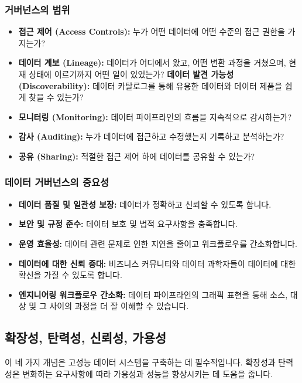 \documentclass[11pt,a4paper]{article}
\theoremstyle{definition}
\begin{document}
\begin{enumerate}
\subsubsection{거버넌스의 범위}
\begin{itemize}
    \item \textbf{접근 제어 (Access Controls):} 누가 어떤 데이터에 어떤 수준의 접근 권한을 가지는가?
    \item \textbf{데이터 계보 (Lineage):} 데이터가 어디에서 왔고, 어떤 변환 과정을 거쳤으며, 현재 상태에 이르기까지 어떤 일이 있었는가?
    \textbf{데이터 발견 가능성 (Discoverability):} 데이터 카탈로그를 통해 유용한 데이터와 데이터 제품을 쉽게 찾을 수 있는가?
    \item \textbf{모니터링 (Monitoring):} 데이터 파이프라인의 흐름을 지속적으로 감시하는가?
    \item \textbf{감사 (Auditing):} 누가 데이터에 접근하고 수정했는지 기록하고 분석하는가?
    \item \textbf{공유 (Sharing):} 적절한 접근 제어 하에 데이터를 공유할 수 있는가?
\end{itemize}

\subsubsection{데이터 거버넌스의 중요성}
\begin{itemize}
    \item \textbf{데이터 품질 및 일관성 보장:} 데이터가 정확하고 신뢰할 수 있도록 합니다.
    \item \textbf{보안 및 규정 준수:} 데이터 보호 및 법적 요구사항을 충족합니다.
    \item \textbf{운영 효율성:} 데이터 관련 문제로 인한 지연을 줄이고 워크플로우를 간소화합니다.
    \item \textbf{데이터에 대한 신뢰 증대:} 비즈니스 커뮤니티와 데이터 과학자들이 데이터에 대한 확신을 가질 수 있도록 합니다.
    \item \textbf{엔지니어링 워크플로우 간소화:} 데이터 파이프라인의 그래픽 표현을 통해 소스, 대상 및 그 사이의 과정을 더 잘 이해할 수 있습니다.
\end{itemize}

\subsection{확장성, 탄력성, 신뢰성, 가용성}

이 네 가지 개념은 고성능 데이터 시스템을 구축하는 데 필수적입니다. 확장성과 탄력성은 변화하는 요구사항에 따라 가용성과 성능을 향상시키는 데 도움을 줍니다.


\end{enumerate}
\end{document}
